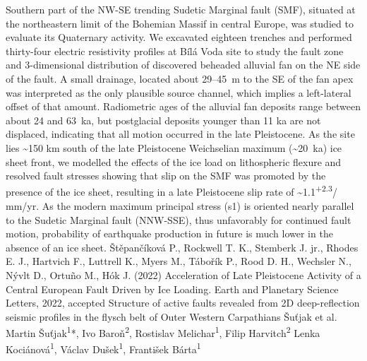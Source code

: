 {Southern part of the NW-SE trending Sudetic Marginal fault (SMF), situated at the northeastern limit of the Bohemian Massif in central Europe, was studied to evaluate its Quaternary activity. We excavated eighteen trenches and performed thirty-four electric resistivity profiles at Bílá Voda site to study the fault zone and 3-dimensional distribution of discovered beheaded alluvial fan on the NE side of the fault.  A small drainage, located about 29--45~m to the SE of the fan apex was interpreted as the only plausible source channel, which implies a left-lateral offset of that amount. Radiometric ages of the alluvial fan deposits range between about 24 and 63~ka, but postglacial deposits younger than 11 ka are not displaced, indicating that all motion occurred in the late Pleistocene. As the site lies \textasciitilde150 km south of the late Pleistocene Weichselian maximum (\textasciitilde20~ka) ice sheet front, we modelled the effects of the ice load on lithospheric flexure and resolved fault stresses showing that slip on the SMF was promoted by the presence of the ice sheet, resulting in a late Pleistocene slip rate of \textasciitilde1.1\textsuperscript{+2.3}/\textsubscript{} mm/yr. As the modern maximum principal stress (s1) is oriented nearly parallel to the Sudetic Marginal fault (NNW-SSE), thus unfavorably for continued fault motion, probability of earthquake production in future is much lower in the absence of an ice sheet.
}
{Štěpančíková P., Rockwell T. K., Stemberk J. jr., Rhodes E. J., Hartvich F., Luttrell K., Myers M., Tábořík P., Rood D. H., Wechsler N., Nývlt D., Ortuño M., Hók J. (2022) Acceleration of Late Pleistocene Activity of a Central European Fault Driven by Ice Loading. Earth and Planetary Science Letters, 2022, accepted 
}
\abstract
{Structure of active faults revealed from 2D deep-reflection seismic profiles in the flysch belt of Outer Western Carpathians} 
{Šuťjak et al.} 
{Martin Šuťjak\textsuperscript{1}*, Ivo Baroň\textsuperscript{2}, Rostislav Melichar\textsuperscript{1}, Filip Harvitch\textsuperscript{2} Lenka Kociánová\textsuperscript{1}, Václav Dušek\textsuperscript{1}, František Bárta\textsuperscript{1}} 
{\TLtag} 

